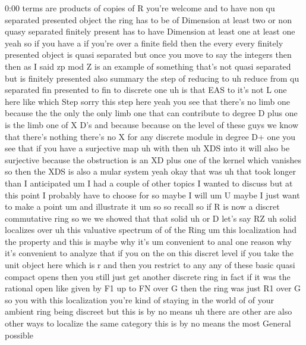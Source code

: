 \begin{unfinished}{0:00}
terms  are  products  of  copies  of
R  you're
welcome  and  to  have  non  qu  separated
presented  object  the  ring  has  to  be  of
Dimension  at  least  two  or  non  quasy
separated  finitely  present  has  to  have
Dimension  at  least  one  at  least  one
yeah  so  if  you  have  a  if  you're  over  a
finite  field  then  the  every  every
finitely  presented  object  is  quasi
separated  but  once  you  move  to  say  the
integers  then  then  as  I  said  zp  mod  Z  is
an  example  of  something  that's  not  quasi
separated  but  is  finitely  presented
also  summary  the  step  of  reducing  to  uh
reduce
from  qu  separated  fin  presented  to  fin
to  discrete  one  uh  is  that  EAS  to  it's
not  L  one  here  like  which  Step  sorry
this  step  here  yeah  you  see  that  there's
no  limb  one  because  the  the  only  the
only  limb  one  that  can  contribute  to
degree  D  plus  one  is  the  limb  one  of  X
D's  and  because  because  on  the  level  of
these  guys  we  know  that  there's  nothing
there's  no  X  for  any  discrete  module  in
degree  D+  one  you  see  that  if  you  have  a
surjective  map  uh  with  then  uh  XDS  into
it  will  also  be  surjective  because  the
obstruction  is  an  XD  plus  one  of  the
kernel  which
vanishes  so  then  the  XDS  is  also  a  mular
system  yeah
okay  that  was  uh  that  took  longer  than  I
anticipated
um  I  had  a  couple  of  other  topics  I
wanted  to  discuss  but  at  this  point  I
probably  have  to
choose
for  so  maybe  I  will
um  U  maybe  I  just  want  to  make  a  point
um  and  illustrate
it
um  so  so
recall  so  if  R  is  now  a  discret
commutative
ring  so  we  we
showed  that
that  solid  uh  or  D  let's  say
RZ  uh  solid
localizes
over
uh
this  valuative  spectrum  of  of  the
Ring
um  this  localization  had  the  property
and  this  is  maybe  why  it's  um  convenient
to  anal  one  reason  why  it's  convenient
to  analyze  that  if  you  on  the  on  this
discret  level  if  you  take  the  unit
object  here  which  is  r  and  then  you
restrict  to  any  any  of  these  basic  quasi
compact  opens  then  you  still  just  get
another  discrete  ring  in  fact  if  it  was
the  rational  open  like  given  by  F1  up  to
FN  over  G  then  the  ring  was  just  R1  over
G  so  you  with  this  localization  you're
kind  of  staying  in  the  world  of  of  your
ambient  ring  being  discreet  but  this  is
by  no  means  uh  there  are  other
are
also  other
ways  to
localize  the  same  category  this  is  by  no
means  the  most  General  possible

\end{unfinished}
